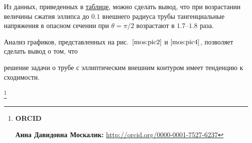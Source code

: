  

Из данных, приведенных в \hyperlink{moskalik:tabl}{таблице}, можно сделать вывод, что при возрастании величины сжатия эллипса до $0.1$ внешнего радиуса трубы тангенциальные напряжения в опасном сечении при $\theta=\pi/2$ возрастают в $1.7$--$1.8$ раза.

Анализ графиков, представленных на рис.~$\ref{mos:pic2}$ и $\ref{mos:pic4}$,  позволяет сделать вывод о том, что

решение задачи о трубе с эллиптическим внешним контуром имеет тенденцию к сходимости.



\thanks{{\bf ORCID}



{\bf Анна Давидовна Москалик:} \url{http://orcid.org/0000-0001-7527-6237}





}





\RusRef




